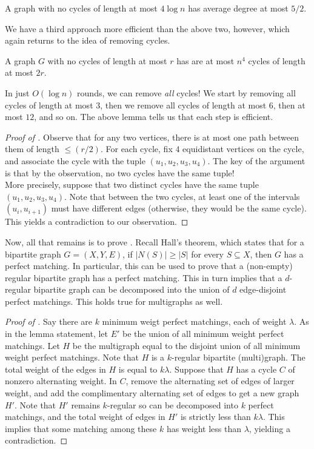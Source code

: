 		\begin{flem}
			A graph with no cycles of length at most $4 \log n$ has average degree at most $5/2$.
		\end{flem}

		We have a third approach more efficient than the above two, however, which again returns to the idea of removing cycles.

		\begin{flem}
			\label{lemma: teo koh}
			A graph $G$ with no cycles of length at most $r$ has are at most $n^4$ cycles of length at most $2r$. 
		\end{flem}

		In just $O(\log n)$ rounds, we can remove \emph{all} cycles! We start by removing all cycles of length at most $3$, then we remove all cycles of length at most $6$, then at most $12$, and so on. The above lemma tells us that each step is efficient.

		\begin{proof}[Proof of ]
			Observe that for any two vertices, there is at most one path between them of length $\le (r/2)$. For each cycle, fix $4$ equidistant vertices on the cycle, and associate the cycle with the tuple $(u_1,u_2,u_3,u_4)$. The key of the argument is that by the observation, no two cycles have the same tuple!\\
			More precisely, suppose that two distinct cycles have the same tuple $(u_1,u_2,u_3,u_4)$. Note that between the two cycles, at least one of the intervals $(u_i,u_{i+1})$ must have different edges (otherwise, they would be the same cycle). This yields a contradiction to our observation.
		\end{proof}

		Now, all that remains is to prove . Recall Hall's theorem, which states that for a bipartite graph $G = (X,Y,E)$, if $|N(S)| \ge |S|$ for every $S \subseteq X$, then $G$ has a perfect matching. In particular, this can be used to prove that a (non-empty) regular bipartite graph has a perfect matching. This in turn implies that a $d$-regular bipartite graph can be decomposed into the union of $d$ edge-disjoint perfect matchings. This holds true for multigraphs as well.

		\begin{proof}[Proof of ]
			Say there are $k$ minimum weigt perfect matchings, each of weight $\lambda$. As in the lemma statement, let $E'$ be the union of all minimum weight perfect matchings. Let $H$ be the multigraph equal to the disjoint union of all minimum weight perfect matchings. Note that $H$ is a $k$-regular bipartite (multi)graph. The total weight of the edges in $H$ is equal to $k\lambda$. Suppose that $H$ has a cycle $C$ of nonzero alternating weight. In $C$, remove the alternating set of edges of larger weight, and add the complimentary alternating set of edges to get a new graph $H'$. Note that $H'$ remains $k$-regular so can be decomposed into $k$ perfect matchings, and the total weight of edges in $H'$ is strictly less than $k\lambda$. This implies that some matching among these $k$ has weight less than $\lambda$, yielding a contradiction.
		\end{proof}